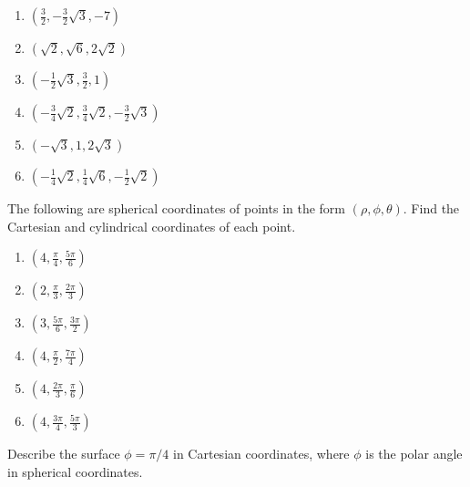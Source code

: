 \begin{enumialphparenastyle}
\begin{ex}
\begin{enumerate}
\item $\left( \frac{3}{2},-\frac{3}{2}\sqrt{3},-7\right) $

\item $\left( \sqrt{2},\sqrt{6},2\sqrt{2}\right) $

\item $\left( -\frac{1}{2}\sqrt{3},\frac{3}{2},1\right) $

\item $\left( -\frac{3}{4}\sqrt{2},\frac{3}{4}\sqrt{2},-\frac{3}{2}\sqrt{3}\right) $

\item $\left( -\sqrt{3},1,2\sqrt{3}\right) $

\item $\left( -\frac{1}{4}\sqrt{2},\frac{1}{4}\sqrt{6},-\frac{1}{2}\sqrt{2}\right) $
\end{enumerate}
\end{ex}

\begin{ex}
The following are spherical coordinates of points in the form $\left(
\rho,\phi,\theta \right)$. Find the Cartesian and cylindrical
coordinates of each point.

\begin{enumerate}
\item $\left( 4,\frac{\pi }{4},\frac{5\pi }{6}\right) $

\item $\left( 2,\frac{\pi }{3},\frac{2\pi }{3}\right) $

\item $\left( 3,\frac{5\pi }{6},\frac{3\pi }{2}\right) $

\item $\left( 4,\frac{\pi }{2},\frac{7\pi }{4}\right) $

\item $\left( 4,\frac{2\pi }{3},\frac{\pi }{6}\right) $

\item $\left( 4,\frac{3\pi }{4},\frac{5\pi }{3}\right) $
\end{enumerate}
\end{ex}

\begin{ex} Describe the surface $\phi =\pi
/4$ in Cartesian coordinates, where $\phi $ is the polar angle in spherical coordinates.
\end{ex}


\end{enumialphparenastyle}
